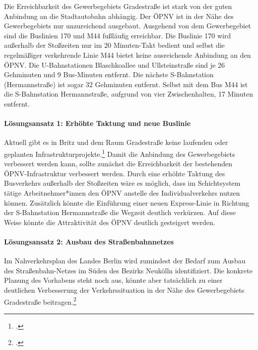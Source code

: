 
Die Erreichbarkeit des Gewerbegebiets Gradestraße ist stark von der guten Anbindung an die Stadtautobahn abhängig. Der ÖPNV ist in der Nähe des Gewerbegebiets nur unzureichend ausgebaut. Ausgehend von dem Gewerbegebiet sind die Buslinien 170 und M44 fußläufig erreichbar. Die Buslinie 170 wird außerhalb der Stoßzeiten nur im 20 Minuten-Takt bedient und selbst die regelmäßiger verkehrende Linie M44 bietet keine ausreichende Anbindung an den ÖPNV. Die U-Bahnstationen Blaschkoallee und Ullsteinstraße sind je 26 Gehminuten und 9 Bus-Minuten entfernt. Die nächste S-Bahnstation (Hermannstraße) ist sogar 32 Gehminuten entfernt. Selbst mit dem Bus M44 ist die S-Bahnstation Hermannstraße, aufgrund von vier Zwischenhalten, 17 Minuten entfernt.

\paragraph{Lösungsansatz 1: Erhöhte Taktung und neue Buslinie}
Aktuell gibt es in Britz und dem Raum Gradestraße keine laufenden oder geplanten Infrastrukturprojekte.\footcite{NahverkehrsplanBerlin} Damit die Anbindung des Gewerbegebiets verbessert werden kann, sollte zunächst die Erreichbarkeit der bestehenden ÖPNV-Infrastruktur verbessert werden. Durch eine erhöhte Taktung des Busverkehrs außerhalb der Stoßzeiten wäre es möglich, dass im Schichtsystem tätige Arbeitnehmer*innen den ÖPNV anstelle des Individualverkehrs nutzen können. Zusätzlich könnte die Einführung einer neuen Express-Linie in Richtung der S-Bahnstation Hermannstraße die Wegzeit deutlich verkürzen. Auf diese Weise könnte die Attraktivität des ÖPNV deutlich gesteigert werden.

\paragraph{Lösungsansatz 2: Ausbau des Straßenbahnnetzes}
Im Nahverkehrsplan des Landes Berlin wird zumindest der Bedarf zum Ausbau des Straßenbahn-Netzes im Süden des Bezirks Neukölln identifiziert. Die konkrete Planung des Vorhabens steht noch aus, könnte aber tatsächlich zu einer deutlichen Verbesserung der Verkehrssituation in der Nähe des Gewerbegebiets Gradestraße beitragen.\footcite{NahverkehrsplanBerlin}
